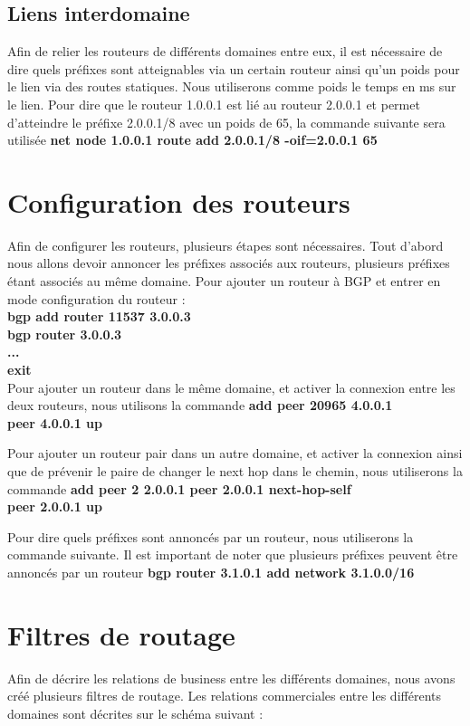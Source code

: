 \documentclass[11pt,a4paper]{article}
\begin{document}
\subsection{Liens interdomaine}
Afin de relier les routeurs de différents domaines entre eux, il est nécessaire de dire quels préfixes sont atteignables via un certain routeur ainsi qu'un poids pour le lien via des routes statiques. Nous utiliserons comme poids le temps en ms sur le lien. Pour dire que le routeur 1.0.0.1 est lié au routeur 2.0.0.1 et permet d'atteindre le préfixe 2.0.0.1/8 avec un poids de 65, la commande suivante sera utilisée \textbf{net node 1.0.0.1 route add 2.0.0.1/8 -oif=2.0.0.1 65}

\section{Configuration des routeurs}
Afin de configurer les routeurs, plusieurs étapes sont nécessaires. Tout d'abord nous allons devoir annoncer les préfixes associés aux routeurs, plusieurs préfixes étant associés au même domaine. Pour ajouter un routeur à BGP et entrer en mode configuration du routeur : \\ \textbf{bgp add router 11537 3.0.0.3\\
bgp router 3.0.0.3\\
	...\\
	exit}\\
Pour ajouter un routeur dans le même domaine, et activer la connexion entre les deux routeurs, nous utilisons la commande \textbf{add peer 20965 4.0.0.1\\
	peer 4.0.0.1 up}
	
Pour ajouter un routeur pair dans un autre domaine, et activer la connexion ainsi que de prévenir le paire de changer le next hop dans le chemin, nous utiliserons la commande \textbf{add peer 2 2.0.0.1
	peer 2.0.0.1 next-hop-self\\
	peer 2.0.0.1 up}
	
	Pour dire quels préfixes sont annoncés par un routeur, nous utiliserons la commande suivante. Il est important de noter que plusieurs préfixes peuvent être annoncés par un routeur \textbf{bgp router 3.1.0.1 add network 3.1.0.0/16}
	
\section{Filtres de routage}
Afin de décrire les relations de business entre les différents domaines, nous avons créé plusieurs filtres de routage. Les relations commerciales entre les différents domaines sont décrites sur le schéma suivant : \\
\end{document}
